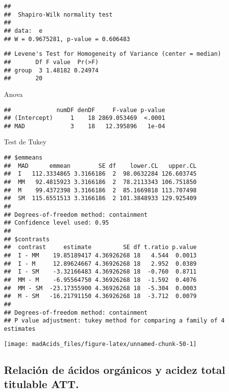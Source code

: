 \documentclass[
]{article}
\begin{document}
\begin{verbatim}
## 
##  Shapiro-Wilk normality test
## 
## data:  e
## W = 0.9675281, p-value = 0.606483
\end{verbatim}

\begin{verbatim}
## Levene's Test for Homogeneity of Variance (center = median)
##       Df F value  Pr(>F)
## group  3 1.48182 0.24974
##       20
\end{verbatim}

Anova

\begin{verbatim}
##             numDF denDF     F-value p-value
## (Intercept)     1    18 2869.053469  <.0001
## MAD             3    18   12.395896   1e-04
\end{verbatim}

Test de Tukey

\begin{verbatim}
## $emmeans
##  MAD      emmean        SE df    lower.CL   upper.CL
##  I   112.3334865 3.3166186  2  98.0632284 126.603745
##  MM   92.4815923 3.3166186  2  78.2113343 106.751850
##  M    99.4372398 3.3166186  2  85.1669818 113.707498
##  SM  115.6551513 3.3166186  2 101.3848933 129.925409
## 
## Degrees-of-freedom method: containment 
## Confidence level used: 0.95 
## 
## $contrasts
##  contrast     estimate         SE df t.ratio p.value
##  I - MM    19.85189417 4.36926268 18   4.544  0.0013
##  I - M     12.89624667 4.36926268 18   2.952  0.0389
##  I - SM    -3.32166483 4.36926268 18  -0.760  0.8711
##  MM - M    -6.95564750 4.36926268 18  -1.592  0.4076
##  MM - SM  -23.17355900 4.36926268 18  -5.304  0.0003
##  M - SM   -16.21791150 4.36926268 18  -3.712  0.0079
## 
## Degrees-of-freedom method: containment 
## P value adjustment: tukey method for comparing a family of 4 estimates
\end{verbatim}

\begin{center}\texttt{[image: madAcids\_files/figure-latex/unnamed-chunk-50-1]} \end{center}

\subsection{Relación de ácidos orgánicos y acidez total titulable
ATT.}\label{relaciuxf3n-de-uxe1cidos-orguxe1nicos-y-acidez-total-titulable-att.}
\end{document}
